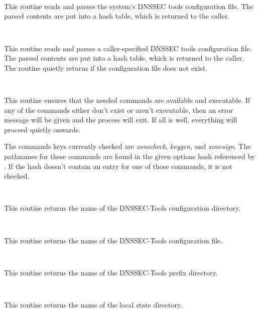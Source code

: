 \begin{description}

\item {}\verb" "

This routine reads and parses the system's DNSSEC tools configuration file.
The parsed contents are put into a hash table, which is returned to the caller.

\item {}\verb" "

This routine reads and parses a caller-specified DNSSEC tools configuration
file.  The parsed contents are put into a hash table, which is returned to
the caller.  The routine quietly returns if the configuration file does not
exist. 

\item {}\verb" "

This routine ensures that the needed commands are available and executable.
If any of the commands either don't exist or aren't executable, then an error
message will be given and the process will exit.  If all is well, everything
will proceed quietly onwards.

The commands keys currently checked are {\it zonecheck}, {\it keygen}, and
{\it zonesign}.  The pathnames for these commands are found in the given
options hash referenced by .  If the hash doesn't
contain an entry for one of those commands, it is not checked.

\item {}\verb" "

This routine returns the name of the DNSSEC-Tools configuration directory.

\item {}\verb" "

This routine returns the name of the DNSSEC-Tools configuration file.

\item {}\verb" "

This routine returns the name of the DNSSEC-Tools prefix directory.

\item {}\verb" "

This routine returns the name of the local state directory.

\item {}\verb" "


\end{description}
